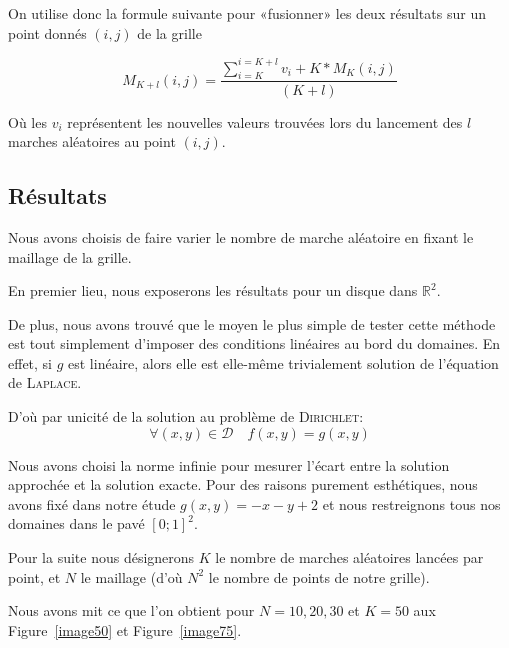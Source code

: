 \documentclass[12pt, a4paper]{article}
\begin{document}
On utilise donc la formule suivante pour «fusionner» les deux résultats sur un point donnés $(i,j)$
de la grille

\[
    M_{K+l}(i,j) = \frac{ \sum_{i=K}^{i=K+l} v_i + K*M_{K}(i,j) }{ (K + l) }
\]

Où les $v_i$ représentent les nouvelles valeurs trouvées lors du lancement des $l$ marches
aléatoires au point $(i,j)$.

\subsection{Résultats}

Nous avons choisis de faire varier le nombre de marche aléatoire en fixant le maillage de la grille.

En premier lieu, nous exposerons les résultats pour un disque dans $\mathbb{R}^2$.

De plus, nous avons trouvé que le moyen le plus simple de tester cette méthode est tout simplement
d'imposer des conditions linéaires au bord du domaines. En effet, si $g$ est linéaire, alors elle
est elle-même trivialement solution de l'équation de \textsc{Laplace}.

D'où par unicité de la solution au problème de \textsc{Dirichlet}:
\[\forall (x,y) \in \mathcal{D} \quad f(x,y) = g(x,y) \]

Nous avons choisi la norme infinie pour mesurer l'écart entre la solution approchée et la solution
exacte. Pour des raisons purement esthétiques, nous avons fixé dans notre étude $g(x,y) =
-x -y+2$ et nous restreignons tous nos domaines dans le pavé $[0;1]^2$.

Pour la suite nous désignerons $K$ le nombre de marches aléatoires lancées par point, et $N$ le
maillage (d'où $N^2$ le nombre de points de notre grille).

Nous avons mit ce que l'on obtient pour $N = {10, 20, 30}$ et $K = 50$ aux Figure~\ref{image50} et
Figure~\ref{image75}.
\end{document}
